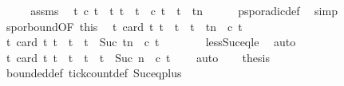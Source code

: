 \begin{isabellebody}
%
\isadelimproof
%
\endisadelimproof
%
\isatagproof
{}\isamarkupfalse%
\ {\isacharminus}\isanewline
\ \ \isamarkupfalse%
\ assms\ \isamarkupfalse%
\ {\isacartoucheopen}{\isasymforall}t{\isachardot}\ c\ t\ {\isasymlongrightarrow}\ {\isacharparenleft}{\isasymforall}t{\isacharprime}{\isachardot}\ {\isacharparenleft}t\ {\isacharless}\ t{\isacharprime}\ {\isasymand}\ c\ t{\isacharprime}{\isacharparenright}\ {\isasymlongrightarrow}\ t{\isacharprime}\ {\isachargreater}\ t{\isacharplus}n{\isacharparenright}{\isacartoucheclose}\isanewline
\ \ \ \ \isamarkupfalse%
\ p{\isacharunderscore}sporadic{\isacharunderscore}def\ \isamarkupfalse%
\ simp\isanewline
\ \ \isamarkupfalse%
\ spor{\isacharunderscore}bound{\isacharprime}{\isacharbrackleft}OF\ this{\isacharbrackright}\ \isamarkupfalse%
\ {\isacartoucheopen}{\isasymforall}t{\isachardot}\ card\ {\isacharbraceleft}t{\isacharprime}{\isachardot}\ t\ {\isasymle}\ t{\isacharprime}\ {\isasymand}\ t{\isacharprime}\ {\isasymle}\ t{\isacharplus}n\ {\isasymand}\ c\ t{\isacharprime}{\isacharbraceright}\ {\isasymle}\ {}{\isacartoucheclose}\ \isacommand{{\isachardot}}\isamarkupfalse%
\isanewline
\ \ \isamarkupfalse%
\ {\isacartoucheopen}{\isasymforall}t{\isachardot}\ card\ {\isacharbraceleft}t{\isacharprime}{\isachardot}\ t\ {\isasymle}\ t{\isacharprime}\ {\isasymand}\ t{\isacharprime}\ {\isacharless}\ Suc\ {\isacharparenleft}t{\isacharplus}n{\isacharparenright}\ {\isasymand}\ c\ t{\isacharprime}{\isacharbraceright}\ {\isasymle}\ {}{\isacartoucheclose}\isanewline
\ \ \ \ \isamarkupfalse%
\ less{\isacharunderscore}Suc{\isacharunderscore}eq{\isacharunderscore}le\ \isamarkupfalse%
\ auto\isanewline
\ \ \isamarkupfalse%
\ {\isacartoucheopen}{\isasymforall}t{\isachardot}\ card\ {\isacharbraceleft}t{\isacharprime}{\isachardot}\ t\ {\isasymle}\ t{\isacharprime}\ {\isasymand}\ t{\isacharprime}\ {\isacharless}\ t\ {\isacharplus}\ Suc\ n\ {\isasymand}\ c\ t{\isacharprime}{\isacharbraceright}\ {\isasymle}\ {}{\isacartoucheclose}\ \isamarkupfalse%
\ auto\isanewline
\ \ \isamarkupfalse%
\ {\isacharquery}thesis\ \isamarkupfalse%
\ bounded{\isacharunderscore}def\ tick{\isacharunderscore}count{\isacharunderscore}def\ Suc{\isacharunderscore}eq{\isacharunderscore}plus{}\ \isacommand{{\isachardot}}\isamarkupfalse%
\isanewline
{}\isamarkupfalse%
%
\endisatagproof

\end{isabellebody}
